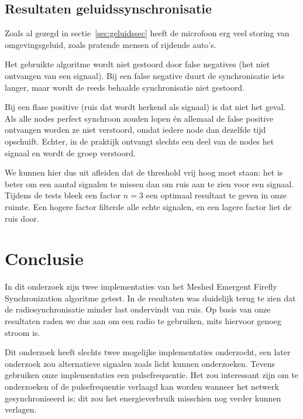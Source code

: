 \documentclass[a4paper,10pt]{article}
\begin{document}
\subsection{Resultaten geluidssynschronisatie}
Zoals al gezegd in sectie~\ref{sec:geluidssec} heeft de microfoon erg veel storing van omgevingsgeluid, zoals pratende mensen of rijdende auto's.

Het gebruikte algoritme wordt niet gestoord door false negatives (het niet ontvangen van een signaal). Bij een false negative duurt de synchronisatie iets langer, maar wordt de reeds behaalde synchronisatie niet gestoord.

Bij een flase positive (ruis dat wordt herkend als signaal) is dat niet het geval. Als alle nodes perfect synchroon zouden lopen \'en allemaal de false positive ontvangen worden ze niet verstoord, omdat iedere node dan dezelfde tijd opschuift. Echter, in de praktijk ontvangt slechts een deel van de nodes het signaal en wordt de groep verstoord.

We kunnen hier dus uit afleiden dat de threshold vrij hoog moet staan: het is beter om een aantal signalen te missen dan om ruis aan te zien voor een signaal. Tijdens de tests bleek een factor $n=3$ een optimaal resultaat te geven in onze ruimte. Een hogere factor filterde alle echte signalen, en een lagere factor liet de ruis door.

\section{Conclusie}\label{sec:conclusie}
In dit onderzoek zijn twee implementaties van het Meshed Emergent Firefly Synchronization algoritme getest. In de resultaten was duidelijk terug te zien dat de radiosynchronisatie minder last ondervindt van ruis. Op basis van onze resultaten raden we dus aan om een radio te gebruiken, mits hiervoor genoeg stroom is.

Dit onderzoek heeft slechts twee mogelijke implementaties onderzocht, een later onderzoek zou alternatieve signalen zoals licht kunnen onderzoeken. Tevens gebruiken onze implementaties een pulsefrequentie. Het zou interessant zijn om te onderzoeken of de pulsefrequentie verlaagd kan worden wanneer het netwerk gesynchroniseerd is; dit zou het energieverbruik misschien nog verder kunnen verlagen.

% 



\end{document}
